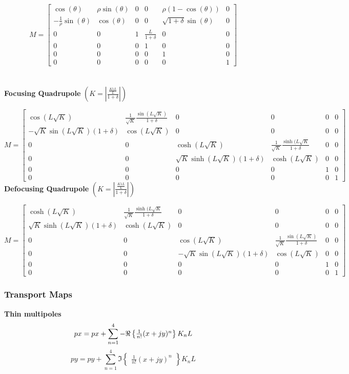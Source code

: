 \documentclass[a4paper]{cernatsnote}
\begin{document}
\[
M
=
\begin{bmatrix}
\cos(\theta) & \rho \sin(\theta) & 0 & 0 & \rho(1-\cos(\theta)) & 0
\\[0.3em]
-\frac{1}{\rho}\sin(\theta) & \cos(\theta) & 0 & 0 &
\sqrt{1+\delta}\sin(\theta) & 0 \\[0.3em]
0 & 0 & 1 & \frac{L}{1+\delta} & 0 & 0 \\[0.3em]
0 & 0 & 0 & 1 & 0 & 0 \\[0.3em]
0 & 0 & 0 & 0 & 1 & 0 \\[0.3em]
0 & 0 & 0 & 0 & 0 & 1
\end{bmatrix}
\]
\\\\
\textbf{Focusing Quadrupole} $(K =|\frac{\frac{K1L}{L}}{1+\delta}|)$

\[
M
=
\begin{bmatrix}
\cos(L\sqrt{K}) & \frac{1}{\sqrt{K}} \frac{\sin(L\sqrt{K})}{1+\delta} & 0 & 0
& 0 & 0\\[0.3em]
-\sqrt{K}\sin(L\sqrt{K})(1+\delta) & \cos(L\sqrt{K}) & 0 & 0 & 0 & 0
\\[0.3em]
0 & 0 & \cosh(L\sqrt{K}) & \frac{1}{\sqrt{K}}\frac{\sinh(L\sqrt{K}}{1+\delta}
& 0 & 0 \\[0.3em]
0 & 0 & \sqrt{K}\sinh(L\sqrt{K})(1+\delta) & \cosh(L\sqrt{K}) & 0 & 0
\\[0.3em]
0 & 0 & 0 & 0 & 1 & 0 \\[0.3em]
0 & 0 & 0 & 0 & 0 & 1
\end{bmatrix}
\]
\newpage
\textbf{Defocusing Quadrupole} $(K =|\frac{\frac{K1L}{L}}{1+\delta}|)$

\[
M
=
\begin{bmatrix}
\cosh(L\sqrt{K}) & \frac{1}{\sqrt{K}}\frac{\sinh(L\sqrt{K}}{1+\delta} & 0 & 0
& 0 & 0\\[0.3em]
\sqrt{K}\sinh(L\sqrt{K})(1+\delta) & \cosh(L\sqrt{K}) & 0 & 0 & 0 & 0
\\[0.3em]
0 & 0 & \cos(L\sqrt{K}) & \frac{1}{\sqrt{K}} \frac{\sin(L\sqrt{K})}{1+\delta}
& 0 & 0 \\[0.3em]
0 & 0 & -\sqrt{K}\sin(L\sqrt{K})(1+\delta) & \cos(L\sqrt{K}) & 0 & 0
\\[0.3em]
0 & 0 & 0 & 0 & 1 & 0 \\[0.3em]
0 & 0 & 0 & 0 & 0 & 1
\end{bmatrix}
\]

\subsubsection{Transport Maps}
\label{ap:trans2}
\textbf{Thin multipoles}
\[
px = px + \sum_{n=1}^{4} -\Re \begin{Bmatrix}\frac{1}{n!} (x +
  jy)^n\end{Bmatrix} K_n L\\[0.4em]
\]
\[
py = py + \sum_{n=1}^{4} \Im \begin{Bmatrix}\frac{1}{n!} (x +
  jy)^n\end{Bmatrix} K_n L
\]
\end{document}
